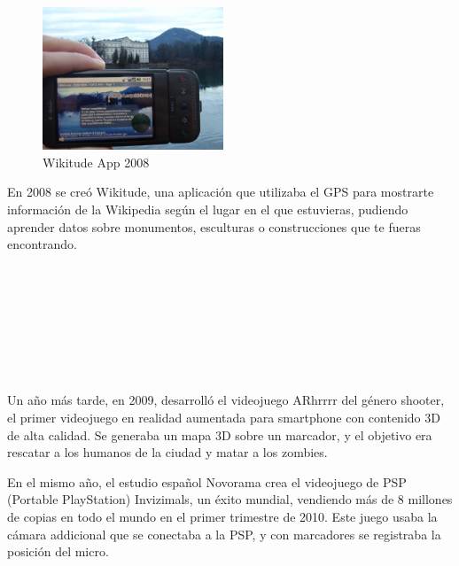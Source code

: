 \begin{figure}
    \centering
    \includegraphics[width=0.48\textwidth]{Images/Wikitude_Example.jpeg}
    \caption{Wikitude App 2008}
    \label{fig:wikitude2008}
\end{figure}
En 2008 se creó Wikitude, una aplicación que utilizaba el GPS para mostrarte información de la Wikipedia según el lugar en el que estuvieras, pudiendo aprender datos sobre monumentos, esculturas o construcciones que te fueras encontrando.\\
\\
\\
\\
\\
\\
\\
\\
\\

Un año más tarde, en 2009, desarrolló el videojuego ARhrrrr del género shooter, el primer videojuego en realidad aumentada para smartphone con contenido 3D de alta calidad. Se generaba un mapa 3D sobre un marcador, y el objetivo era rescatar a los humanos de la ciudad y matar a los zombies. 

En el mismo año, el estudio español Novorama crea el videojuego de PSP (Portable PlayStation) Invizimals, un éxito mundial, vendiendo más de 8 millones de copias en todo el mundo en el primer trimestre de 2010. Este juego usaba la cámara addicional que se conectaba a la PSP, y con marcadores se registraba la posición del micro.

